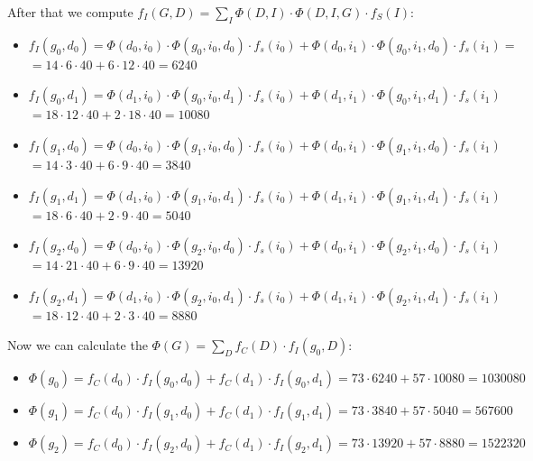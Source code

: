 \documentclass[11pt,a4paper]{article}
\begin{document}
	After that we compute $ f_I(G, D) = \sum_I \Phi(D, I) \cdot \Phi(D, I, G) \cdot f_S(I): $
	\begin{itemize}
		\item $ f_I(g_0, d_0) = \Phi(d_0,i_0) \cdot \Phi(g_0,i_0,d_0) \cdot f_s(i_0) + \Phi(d_0,i_1) \cdot \Phi(g_0,i_1,d_0) \cdot f_s(i_1) = $ \\
		$ = 14 \cdot 6 \cdot 40 + 6 \cdot 12 \cdot 40 = 6240 $
		\item $ f_I(g_0, d_1) = \Phi(d_1,i_0) \cdot \Phi(g_0,i_0,d_1) \cdot f_s(i_0) + \Phi(d_1,i_1) \cdot \Phi(g_0,i_1,d_1) \cdot f_s(i_1) $ \\
		$ = 18 \cdot 12 \cdot 40 + 2 \cdot 18 \cdot 40 = 10080 $
		\item $ f_I(g_1, d_0) = \Phi(d_0,i_0) \cdot \Phi(g_1,i_0,d_0) \cdot f_s(i_0) + \Phi(d_0,i_1) \cdot \Phi(g_1,i_1,d_0) \cdot f_s(i_1) $ \\
		$ = 14 \cdot 3 \cdot 40 + 6 \cdot 9 \cdot 40 = 3840 $
		\item $ f_I(g_1, d_1) = \Phi(d_1,i_0) \cdot \Phi(g_1,i_0,d_1) \cdot f_s(i_0) + \Phi(d_1,i_1) \cdot \Phi(g_1,i_1,d_1) \cdot f_s(i_1) $ \\
		$ = 18 \cdot 6 \cdot 40 + 2 \cdot 9 \cdot 40 = 5040 $
		\item $ f_I(g_2, d_0) = \Phi(d_0,i_0) \cdot \Phi(g_2,i_0,d_0) \cdot f_s(i_0) + \Phi(d_0,i_1) \cdot \Phi(g_2,i_1,d_0) \cdot f_s(i_1) $ \\
		$ = 14 \cdot 21 \cdot 40 + 6 \cdot 9 \cdot 40 = 13920 $
		\item $ f_I(g_2, d_1) = \Phi(d_1,i_0) \cdot \Phi(g_2,i_0,d_1) \cdot f_s(i_0) + \Phi(d_1,i_1) \cdot \Phi(g_2,i_1,d_1) \cdot f_s(i_1) $ \\
		$ = 18 \cdot 12 \cdot 40 + 2 \cdot 3 \cdot 40 = 8880 $
	\end{itemize}
	
	Now we can calculate the $\Phi(G) = \sum_D f_C(D) \cdot f_I(g_0, D): $
	\begin{itemize}
		\item $\Phi(g_0) = f_C(d_0) \cdot f_I(g_0, d_0) + f_C(d_1) \cdot f_I(g_0, d_1)  = 73 \cdot 6240 + 57 \cdot 10080 = 1030080 $
		\item $\Phi(g_1) = f_C(d_0) \cdot f_I(g_1, d_0) + f_C(d_1) \cdot f_I(g_1, d_1)  = 73 \cdot 3840 + 57 \cdot 5040 = 567600 $
		\item $\Phi(g_2) = f_C(d_0) \cdot f_I(g_2, d_0) + f_C(d_1) \cdot f_I(g_2, d_1)= 73 \cdot 13920 + 57 \cdot 8880 = 1522320 $
	\end{itemize}
	
\end{document}
